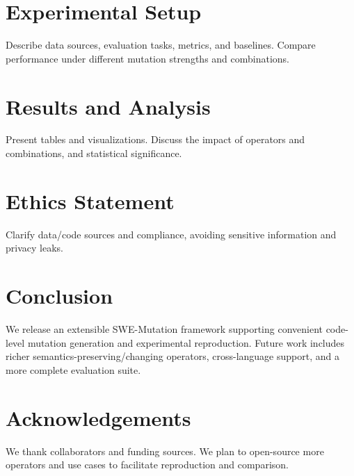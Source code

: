 \documentclass[11pt]{article}
\begin{document}
\section{Experimental Setup}
Describe data sources, evaluation tasks, metrics, and baselines. Compare performance under different mutation strengths and combinations.

\section{Results and Analysis}
Present tables and visualizations. Discuss the impact of operators and combinations, and statistical significance.

\section{Ethics Statement}
Clarify data/code sources and compliance, avoiding sensitive information and privacy leaks.

\section{Conclusion}
We release an extensible SWE-Mutation framework supporting convenient code-level mutation generation and experimental reproduction.
Future work includes richer semantics-preserving/changing operators, cross-language support, and a more complete evaluation suite.

\section*{Acknowledgements}
We thank collaborators and funding sources. We plan to open-source more operators and use cases to facilitate reproduction and comparison.



\end{document}
